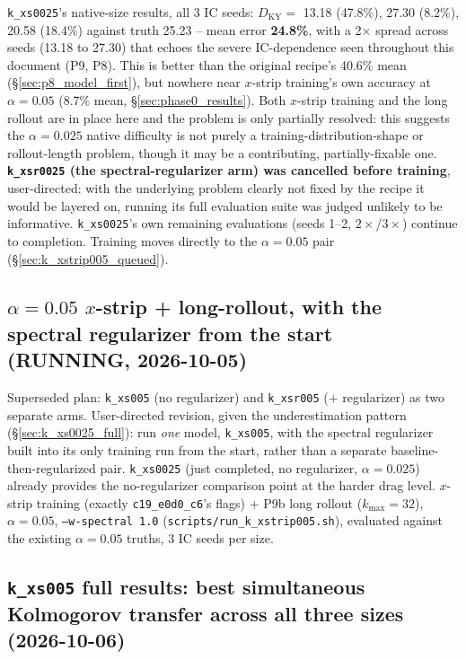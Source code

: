 \documentclass[11pt]{article}
\begin{document}
\texttt{k\_xs0025}'s native-size results, all 3 IC seeds:
$D_{\mathrm{KY}}{=}$ 13.18 (47.8\%), 27.30 (8.2\%), 20.58 (18.4\%)
against truth 25.23 -- mean error \textbf{24.8\%}, with a 2$\times$
spread across seeds (13.18 to 27.30) that echoes the severe
IC-dependence seen throughout this document (P9, P8). This is better
than the original recipe's 40.6\% mean (\S\ref{sec:p8_model_first}), but
nowhere near $x$-strip training's own accuracy at $\alpha{=}0.05$
(8.7\% mean, \S\ref{sec:phase0_results}). Both $x$-strip training and the
long rollout are in place here and the problem is only partially
resolved: this suggests the $\alpha{=}0.025$ native difficulty is not
purely a training-distribution-shape or rollout-length problem, though
it may be a contributing, partially-fixable one. \textbf{\texttt{k\_xsr0025} (the spectral-regularizer
arm) was cancelled before training}, user-directed: with the
underlying problem clearly not fixed by the recipe it would be layered
on, running its full evaluation suite was judged unlikely to be
informative. \texttt{k\_xs0025}'s own remaining evaluations (seeds 1--2,
$2\times$/$3\times$) continue to completion. Training moves directly to
the $\alpha{=}0.05$ pair (\S\ref{sec:k_xstrip005_queued}).

\subsection{$\alpha{=}0.05$ $x$-strip + long-rollout, with the
spectral regularizer from the start (RUNNING, 2026-10-05)}
\label{sec:k_xs005_v2}

Superseded plan: \texttt{k\_xs005} (no regularizer) and
\texttt{k\_xsr005} (+ regularizer) as two separate arms. User-directed
revision, given the underestimation pattern
(\S\ref{sec:k_xs0025_full}): run \emph{one} model, \texttt{k\_xs005},
with the spectral regularizer built into its only training run from the
start, rather than a separate baseline-then-regularized pair.
\texttt{k\_xs0025} (just completed, no regularizer, $\alpha{=}0.025$)
already provides the no-regularizer comparison point at the harder drag
level. $x$-strip training (exactly \texttt{c19\_e0d0\_c6}'s flags) +
P9b long rollout ($k_{\max}{=}32$), $\alpha{=}0.05$,
\texttt{--w-spectral 1.0} (\texttt{scripts/run\_k\_xstrip005.sh}),
evaluated against the existing $\alpha{=}0.05$ truths, 3 IC seeds per
size.

\subsection{\texttt{k\_xs005} full results: best simultaneous
Kolmogorov transfer across all three sizes (2026-10-06)}
\label{sec:k_xs005_full}
\end{document}
